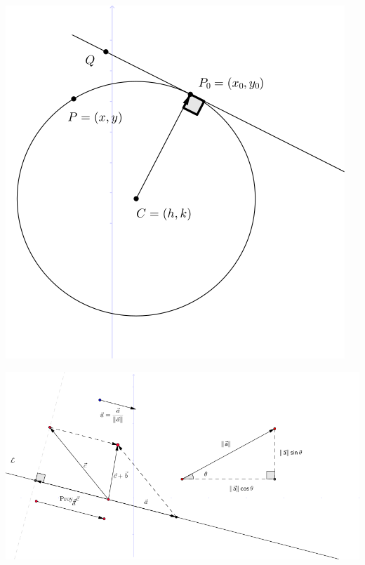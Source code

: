 \documentclass[12pt,]{report}
\let\origfigure=\figure
\let\endorigfigure=\endfigure
\renewenvironment{figure}[1][]{%
  \origfigure[H]
}{%
  \endorigfigure
}
\theoremstyle{slplain}
\begin{document}
\begin{figure}

{\centering \includegraphics{circunferencia} 

}

\caption{Elipse vectorial}\label{fig:C1}
\end{figure}

\begin{figure}

{\centering \includegraphics{vector} 

}

\caption{Elipse vectorial}\label{fig:C2}
\end{figure}
\end{document}
